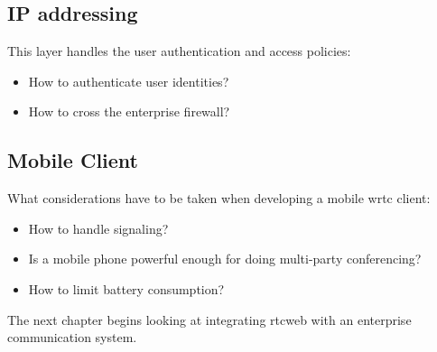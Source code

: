 \subsection{IP addressing}
This layer handles the user authentication and access policies:
\begin{itemize}
\item{How to authenticate user identities?}
\item{How to cross the enterprise firewall?}
\end{itemize}

\subsection{Mobile Client}
What considerations have to be taken when developing a mobile \gls{wrtc} client:
\begin{itemize}
\item{How to handle signaling?}
\item{Is a mobile phone powerful enough for doing multi-party conferencing?}
\item{How to limit battery consumption?}
\end{itemize}

The next chapter begins looking at integrating \gls{rtcweb} with an enterprise communication system.